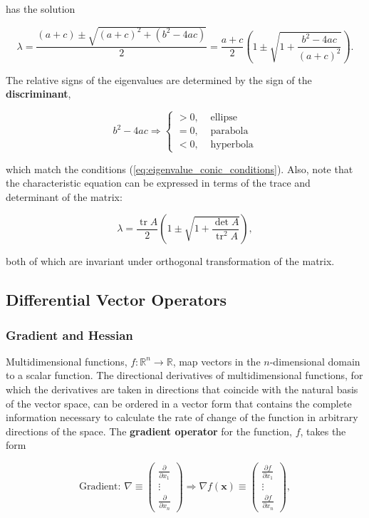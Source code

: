 \documentclass[12pt, twoside, draft]{article}
\begin{document}
has the solution

\begin{equation}
\lambda = \frac{(a+c) \pm \sqrt{(a+c)^2 + (b^2 - 4ac)}}{2} = \frac{a+c}{2} \left( 1 \pm \sqrt{1 + \frac{b^2 - 4ac}{(a+c)^2}} \right).
\end{equation}

The relative signs of the eigenvalues are determined by the sign of the \textbf{discriminant},

\begin{equation}
b^2-4ac \Rightarrow \begin{cases}
 > 0, &\text{  ellipse} \\
 = 0, &\text{  parabola} \\
< 0, &\text{  hyperbola} \end{cases}
\end{equation}

which match the conditions (\ref{eq:eigenvalue_conic_conditions}).  Also, note that the characteristic equation can be expressed in terms of the trace and determinant of the matrix:

\begin{equation}
\lambda = \frac{\operatorname{tr}A}{2} \left( 1 \pm \sqrt{1 + \frac{\det A}{\operatorname{tr}^2 A}} \right),
\end{equation}

both of which are invariant under orthogonal transformation of the matrix.

\subsection{Differential Vector Operators}\label{sec:differential_vector_operators}
\subsubsection{Gradient and Hessian}\label{sec:gradient_hessian}
Multidimensional functions, $f: \mathbb{R}^n \rightarrow \mathbb{R}$, map vectors in the $n$-dimensional domain to a scalar function.  The directional derivatives of multidimensional functions, for which the derivatives are taken in directions that coincide with the natural basis of the vector space, can be ordered in a vector form that contains the complete information necessary to calculate the rate of change of the function in arbitrary directions of the space.  The \textbf{gradient operator} for the function, $f$, takes the form

\begin{equation}
\text{Gradient: }\nabla \equiv \begin{pmatrix} \frac{\partial}{\partial x_1} \\ \vdots \\ \frac{\partial}{\partial x_n} \end{pmatrix} \Rightarrow
\nabla f(\mathbf{x}) \equiv \begin{pmatrix} \frac{\partial f}{\partial x_1} \\ \vdots \\ \frac{\partial f}{\partial x_n} \end{pmatrix},
\end{equation}
\end{document}
